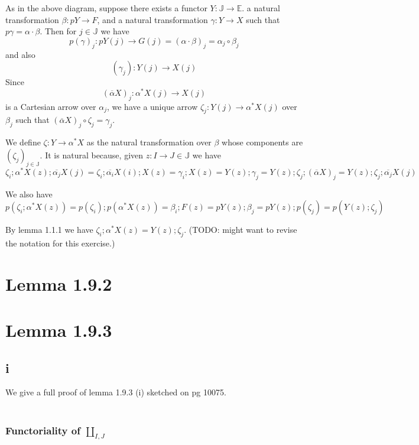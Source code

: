 \documentclass{article}
\begin{document}
As in the above diagram, suppose there exists a functor $Y : \mathbb J \to \mathbb E$. a natural transformation $\beta : pY \to F$, and a natural transformation $\gamma : Y \to X$ such that 
$p \gamma = \alpha \cdot \beta$. Then for $j \in \mathbb J$ we have $$p(\gamma)_j : pY(j) \to G(j) = (\alpha \cdot \beta)_j = \alpha_j \circ \beta_j$$
and also
$$(\gamma_j) : Y(j) \to X(j)$$
Since $$(\overline{\alpha} X)_j : \alpha^*X(j) \to X(j)$$ is a Cartesian arrow over $\alpha_j$, we have a unique arrow $\zeta_j : Y(j) \to \alpha^* X(j)$ over $\beta_j$ such that
$(\overline{\alpha} X)_j \circ \zeta_j = \gamma_j$. 

We define $\zeta : Y \to \alpha^* X$ as the natural transformation over $\beta$ whose components are $(\zeta_j)_{j \in \mathbb J}$. It is natural because, given $z : I \to J \in \mathbb J$ we have
$$\zeta_i;\alpha^*X(z);\overline{\alpha_j}X(j) = \zeta_i;\overline{\alpha_i}X(i);X(z) = \gamma_i;X(z) = Y(z);\gamma_j = Y(z);\zeta_j;(\overline{\alpha}X)_j = Y(z) ; \zeta_j;\overline{\alpha_j} X(j)$$

We also have $$p(\zeta_i; \alpha^* X(z)) = p(\zeta_i);p(\alpha^* X(z)) = \beta_i;F(z) = pY(z);\beta_j = pY(z);p(\zeta_j) = p(Y(z);\zeta_j)$$

By lemma 1.1.1 we have $\zeta_i;\alpha^*X(z) = Y(z);\zeta_j$. (TODO: might want to revise the notation for this exercise.)

\section*{Lemma 1.9.2}


\section*{Lemma 1.9.3}

\subsection*{i}
We give a full proof of lemma 1.9.3 (i) sketched on pg 10075.\\~\\

\subsubsection*{Functoriality of $\coprod_{I,J}$}
\end{document}
